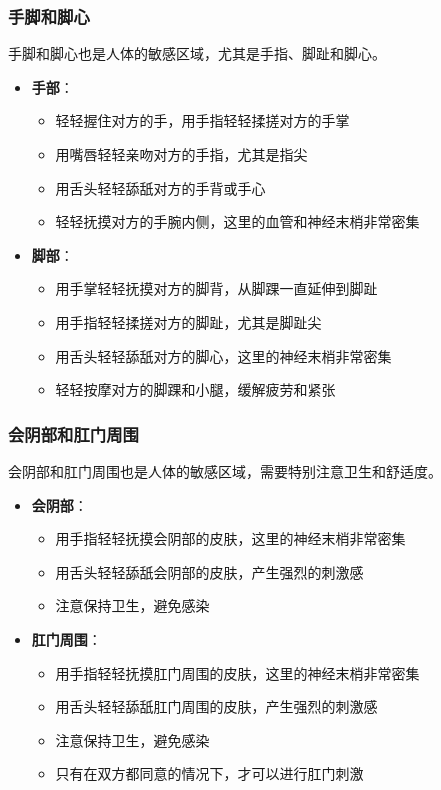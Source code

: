 \documentclass[12pt,UTF8]{ctexbook}
\begin{document}
\subsubsection{手脚和脚心}

手脚和脚心也是人体的敏感区域，尤其是手指、脚趾和脚心。

\begin{itemize}
\item \textbf{手部}：
  \begin{itemize}
  \item 轻轻握住对方的手，用手指轻轻揉搓对方的手掌
  \item 用嘴唇轻轻亲吻对方的手指，尤其是指尖
  \item 用舌头轻轻舔舐对方的手背或手心
  \item 轻轻抚摸对方的手腕内侧，这里的血管和神经末梢非常密集
  \end{itemize}
\item \textbf{脚部}：
  \begin{itemize}
  \item 用手掌轻轻抚摸对方的脚背，从脚踝一直延伸到脚趾
  \item 用手指轻轻揉搓对方的脚趾，尤其是脚趾尖
  \item 用舌头轻轻舔舐对方的脚心，这里的神经末梢非常密集
  \item 轻轻按摩对方的脚踝和小腿，缓解疲劳和紧张
  \end{itemize}
\end{itemize}

\subsubsection{会阴部和肛门周围}

会阴部和肛门周围也是人体的敏感区域，需要特别注意卫生和舒适度。

\begin{itemize}
\item \textbf{会阴部}：
  \begin{itemize}
  \item 用手指轻轻抚摸会阴部的皮肤，这里的神经末梢非常密集
  \item 用舌头轻轻舔舐会阴部的皮肤，产生强烈的刺激感
  \item 注意保持卫生，避免感染
  \end{itemize}
\item \textbf{肛门周围}：
  \begin{itemize}
  \item 用手指轻轻抚摸肛门周围的皮肤，这里的神经末梢非常密集
  \item 用舌头轻轻舔舐肛门周围的皮肤，产生强烈的刺激感
  \item 注意保持卫生，避免感染
  \item 只有在双方都同意的情况下，才可以进行肛门刺激
  \end{itemize}
\end{itemize}
\end{document}
